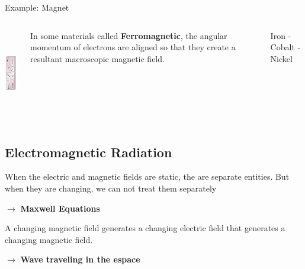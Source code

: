 \documentclass[]{beamer}
\begin{document}
\begin{frame}

Example: Magnet
   \begin{columns}[c]
   \column{2in}  %

  \begin{center}
  \includegraphics[height=1.5in]{images5/ferromagnetic.jpg}
\end{center}


   \column{2in}

\pause



In some materials called \textbf{Ferromagnetic}, the angular momentum of electrons are aligned so that they create a resultant macroscopic magnetic field.

\vspace{3mm}

\pause

Iron - Cobalt - Nickel

   \end{columns}









  \end{frame}



\subsection{Electromagnetic Radiation}

\begin{frame}

When the electric and magnetic fields are static, the are separate entities. But when they are changing,  we can not treat them separately 

\pause
\vspace{3mm}

$\rightarrow$ \textbf{Maxwell Equations}

\pause
\vspace{3mm}

A changing magnetic field generates a changing electric field that generates a changing magnetic field.

\pause
\vspace{3mm}

$\rightarrow$ \textbf{Wave traveling in the espace}

  \end{frame}
\end{document}
